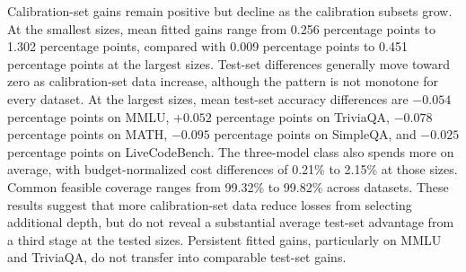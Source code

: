 Calibration-set gains remain positive but decline as the calibration subsets grow.
At the smallest sizes, mean fitted gains range from 0.256 percentage points to 1.302 percentage points,
compared with 0.009 percentage points to 0.451 percentage points at the largest sizes. Test-set differences
generally move toward zero as calibration-set data increase, although the pattern
is not monotone for every dataset. At the largest sizes, mean test-set
accuracy differences are $-0.054$ percentage points on MMLU, $+0.052$ percentage points on
TriviaQA, $-0.078$ percentage points on MATH, $-0.095$ percentage points on SimpleQA, and $-0.025$ percentage points on
LiveCodeBench. The three-model class also spends more on average, with
budget-normalized cost differences of 0.21\% to 2.15\% at those sizes.
Common feasible coverage ranges from 99.32\% to 99.82\% across datasets.
These results suggest that more calibration-set data reduce losses from selecting
additional depth, but do not reveal a substantial average test-set advantage
from a third stage at the tested sizes. Persistent fitted gains, particularly
on MMLU and TriviaQA, do not transfer into comparable test-set gains.
